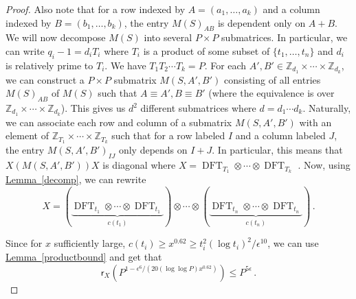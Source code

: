 \documentclass[11pt]{article}
\numberwithin{equation}{section}
\theoremstyle{definition}
\theoremstyle{plain}
\newcommand{\Z}{\mathbb Z}
\newcommand{\expref}[2]{\hyperref[#2]{#1~\ref{#2}}}
\theoremstyle{definition}
\renewcommand\Z{{\mathbb{Z}}}
\DeclareMathOperator{\DFT}{DFT}
\begin{document}
\begin{proof}
Also note that for a row indexed by $A = (a_1, \dots , a_k)$ and a column indexed by $B = (b_1, \dots , b_k)$, the entry $M(S)_{AB}$ is dependent only on $A+B$.  We will now decompose $M(S)$ into several $P \times P$ submatrices.  In particular, we can write $q_i-1 = d_i T_i$ where $T_i$ is a product of some subset of $\{t_1, \dots , t_n \}$ and $d_i$ is relatively prime to $T_i$.  We have $T_1T_2\cdots T_k = P$.  For each $A',B' \in \Z_{d_1} \times \cdots \times \Z_{d_k}$, we can construct a $P \times P$ submatrix $M(S,A',B')$ consisting of all entries $M(S)_{AB}$ of $M(S)$ such that $A \equiv A', B \equiv B'$ (where the equivalence is over $\Z_{d_1} \times \cdots \times \Z_{d_k}$).  This gives us $d^2$ different submatrices where $d =  d_1\cdots d_k$.  Naturally, we can associate each row and column of a submatrix $M(S,A',B')$ with an element of $\Z_{T_1} \times \cdots \times \Z_{T_k}$ such that for a row labeled $I$ and a column labeled $J$, the entry $M(S,A',B')_{IJ}$ only depends on $I+J$.  In particular, this means that $X\left(M(S,A',B')\right)X$ is diagonal where %
$X = \DFT_{T_1} \otimes \cdots \otimes \DFT_{T_k}$ %
.  Now, using \expref{Lemma}{decomp}, we can rewrite 
%
%
%
%
\[
X = (\underbrace{\DFT_{t_1} \otimes \cdots \otimes \DFT_{t_1}}_\text{$c(t_1)$}) \otimes \cdots \otimes  (\underbrace{\DFT_{t_n} \otimes \cdots \otimes \DFT_{t_n}}_\text{$c(t_n)$}) \,.
\] %

Since for $x$ sufficiently large, $c(t_i) \geq x^{0.62} \geq t_i^2(\log t_i)^2/\epsilon^{10}$, we can use \expref{Lemma}{productbound} and get that
\[
\textsf{r}_X\left( P^{1 - \epsilon^6/(20(\log \log P) x^{0.62})}\right) \leq  P^{5 \epsilon} \,.
\]




\end{proof}
\end{document}
